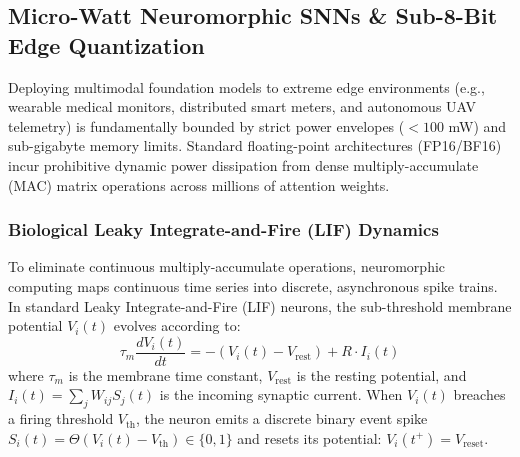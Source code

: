 \subsection{Micro-Watt Neuromorphic SNNs \& Sub-8-Bit Edge Quantization}
\label{sec:neuromorphic_snn}
Deploying multimodal foundation models to extreme edge environments (e.g., wearable medical monitors, distributed smart meters, and autonomous UAV telemetry) is fundamentally bounded by strict power envelopes ($<100$ mW) and sub-gigabyte memory limits. Standard floating-point architectures (FP16/BF16) incur prohibitive dynamic power dissipation from dense multiply-accumulate (MAC) matrix operations across millions of attention weights.

\subsubsection{Biological Leaky Integrate-and-Fire (LIF) Dynamics}
To eliminate continuous multiply-accumulate operations, neuromorphic computing maps continuous time series into discrete, asynchronous spike trains. In standard Leaky Integrate-and-Fire (LIF) neurons, the sub-threshold membrane potential $V_i(t)$ evolves according to:
\begin{equation}
    \tau_m \frac{d V_i(t)}{dt} = -\left(V_i(t) - V_{\text{rest}}\right) + R \cdot I_i(t)
\end{equation}
where $\tau_m$ is the membrane time constant, $V_{\text{rest}}$ is the resting potential, and $I_i(t) = \sum_j W_{ij} S_j(t)$ is the incoming synaptic current. When $V_i(t)$ breaches a firing threshold $V_{\text{th}}$, the neuron emits a discrete binary event spike $S_i(t) = \Theta(V_i(t) - V_{\text{th}}) \in \{0, 1\}$ and resets its potential: $V_i(t^+) = V_{\text{reset}}$.

